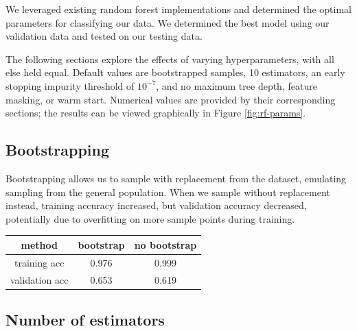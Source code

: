 \documentclass{article}
\begin{document}
\begin{multicols}{2}
We leveraged existing random forest implementations
and determined the optimal parameters for classifying our data.
We determined the best model using our validation data
and tested on our testing data.

The following sections explore the effects of varying hyperparameters,
with all else held equal.
Default values are bootstrapped samples,
10 estimators, an early stopping impurity threshold of $10^{-7}$,
and no maximum tree depth,
feature masking, or warm start.
Numerical values are provided by
their corresponding sections;
the results can be viewed graphically
in Figure \ref{fig:rf-params}.

\subsection{Bootstrapping}

Bootstrapping allows us to sample with replacement
from the dataset,
emulating sampling from the general population.
When we sample without replacement instead,
training accuracy increased,
but validation accuracy decreased,
potentially due to overfitting on more sample points during training.

%
\begin{center}
    \begin{tabular}{c| c c}
        method & bootstrap & no bootstrap \\\hline
        training acc
        		& 0.976 & 0.999 \\
        validation acc
        		& 0.653 & 0.619
    \end{tabular}
\end{center}

\subsection{Number of estimators}


\end{multicols}
\end{document}
